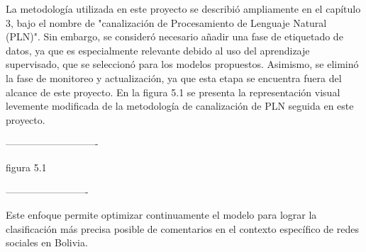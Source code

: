 La metodología utilizada en este proyecto se describió ampliamente en el capítulo 3, bajo el nombre de "canalización de Procesamiento de Lenguaje Natural (PLN)". Sin embargo, se consideró necesario añadir una fase de etiquetado de datos, ya que es especialmente relevante debido al uso del aprendizaje supervisado, que se seleccionó para los modelos propuestos. Asimismo, se eliminó la fase de monitoreo y actualización, ya que esta etapa se encuentra fuera del alcance de este proyecto. En la figura 5.1 se presenta la representación visual levemente modificada de la metodología de canalización de PLN seguida en este proyecto.

----------------------------

figura 5.1

-------------------------

Este enfoque permite optimizar continuamente el modelo para lograr la clasificación más precisa posible de comentarios en el contexto específico de redes sociales en Bolivia.
